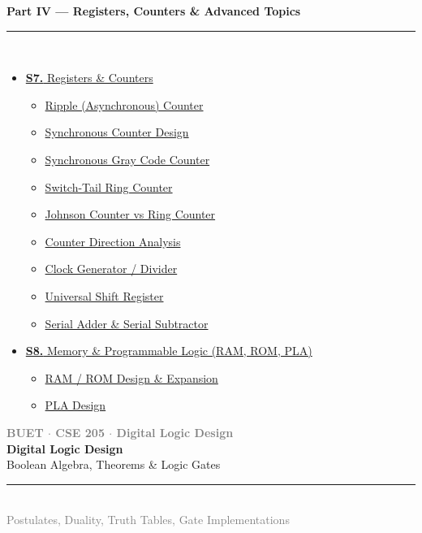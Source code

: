 \documentclass[12pt]{article}
\newcommand{\secdivider}[4]{%
  \newpage\thispagestyle{empty}%
  \vspace*{\fill}%
  \begin{tcolorbox}[enhanced,colback=#4!7,colframe=#3,boxrule=1.5pt,arc=8pt,
    left=20pt,right=20pt,top=22pt,bottom=22pt,
    shadow={3pt}{-3pt}{0pt}{black!15}]
    \centering
    {\large\textcolor{gray}{\textbf{BUET $\cdot$ CSE 205 $\cdot$ Digital Logic Design}}}\\[8pt]
    {\fontsize{26}{32}\selectfont\bfseries\textcolor{#3}{Digital Logic Design}}\\[6pt]
    {\fontsize{15}{19}\selectfont\textcolor{dgray}{#1}}\\[12pt]
    \textcolor{#3!60}{\rule{0.5\textwidth}{0.5pt}}\\[6pt]
    {\small\textcolor{gray}{#2}}
  \end{tcolorbox}%
  \vspace*{\fill}\newpage%
}
\begin{document}
\begin{tcolorbox}[breakable,colback=cG!5,colframe=cG,boxrule=1pt,arc=5pt,
  left=8pt,right=8pt,top=8pt,bottom=8pt,before skip=4pt]
  {\large\bfseries\textcolor{cG}{Part IV --- Registers, Counters \& Advanced Topics}}\\[5pt]
  \textcolor{cG!40}{\rule{\textwidth}{0.4pt}}\\[3pt]
  \small\begin{itemize}[leftmargin=1.2em,itemsep=1pt,label={\textcolor{cG}{$\triangleright$}}]
    \item \hyperref[sec:S7]{\textbf{S7.} Registers \& Counters}
      \begin{itemize}[leftmargin=1.5em,itemsep=0pt,label={\textcolor{cG}{$\cdot$}}]
        \item \hyperref[sub:s7-ripple]{Ripple (Asynchronous) Counter}
        \item \hyperref[sub:s7-sync-counter]{Synchronous Counter Design}
        \item \hyperref[sub:s7-gray]{Synchronous Gray Code Counter}
        \item \hyperref[sub:s7-ring]{Switch-Tail Ring Counter}
        \item \hyperref[sub:s7-johnson]{Johnson Counter vs Ring Counter}
        \item \hyperref[sub:s7-direction]{Counter Direction Analysis}
        \item \hyperref[sub:s7-clock]{Clock Generator / Divider}
        \item \hyperref[sub:s7-universal]{Universal Shift Register}
        \item \hyperref[sub:s7-serial]{Serial Adder \& Serial Subtractor}
      \end{itemize}
    \item \hyperref[sec:S8]{\textbf{S8.} Memory \& Programmable Logic (RAM, ROM, PLA)}
      \begin{itemize}[leftmargin=1.5em,itemsep=0pt,label={\textcolor{cG}{$\cdot$}}]
        \item \hyperref[sub:s8-rom]{RAM / ROM Design \& Expansion}
        \item \hyperref[sub:s8-pla]{PLA Design}
      \end{itemize}
  \end{itemize}
\end{tcolorbox}


\newpage


\secdivider{Boolean Algebra, Theorems \& Logic Gates}{Postulates, Duality, Truth Tables, Gate Implementations}{cA}{cA}
\end{document}

